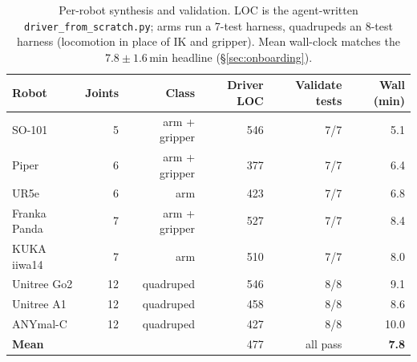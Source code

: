 \begin{table}[t]
\centering
\small
\begin{tabular}{lrrrrr}
\toprule
\textbf{Robot} & \textbf{Joints} & \textbf{Class}
   & \textbf{Driver LOC} & \textbf{Validate tests}
   & \textbf{Wall (min)} \\
\midrule
SO-101       &  5 & arm + gripper   & 546 & 7/7 &  5.1 \\
Piper        &  6 & arm + gripper   & 377 & 7/7 &  6.4 \\
UR5e         &  6 & arm             & 423 & 7/7 &  6.8 \\
Franka Panda &  7 & arm + gripper   & 527 & 7/7 &  8.4 \\
KUKA iiwa14  &  7 & arm             & 510 & 7/7 &  8.0 \\
Unitree Go2  & 12 & quadruped       & 546 & 8/8 &  9.1 \\
Unitree A1   & 12 & quadruped       & 458 & 8/8 &  8.6 \\
ANYmal-C     & 12 & quadruped       & 427 & 8/8 & 10.0 \\
\midrule
\textbf{Mean} &    &                & 477 & all pass & \textbf{7.8} \\
\bottomrule
\end{tabular}
\caption{Per-robot synthesis and validation. LOC is the
agent-written \texttt{driver\_from\_scratch.py}; arms run a 7-test
harness, quadrupeds an 8-test harness (locomotion in place of IK and
gripper). Mean wall-clock matches the $7.8 \pm 1.6$\,min headline
(\S\ref{sec:onboarding}).}
\label{tab:onboarding-detail}
\end{table}

